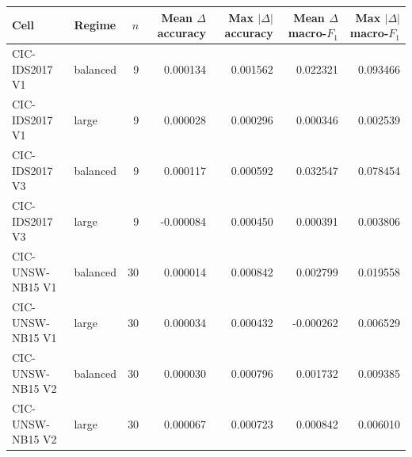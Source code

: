\begin{tabular}{@{}llrrrrr@{}}
\toprule
Cell & Regime & $n$ & Mean $\Delta$ accuracy & Max $|\Delta|$ accuracy & Mean $\Delta$ macro-$F_1$ & Max $|\Delta|$ macro-$F_1$ \\
\midrule
CIC-IDS2017 V1 & balanced & 9 & 0.000134 & 0.001562 & 0.022321 & 0.093466 \\
CIC-IDS2017 V1 & large & 9 & 0.000028 & 0.000296 & 0.000346 & 0.002539 \\
CIC-IDS2017 V3 & balanced & 9 & 0.000117 & 0.000592 & 0.032547 & 0.078454 \\
CIC-IDS2017 V3 & large & 9 & -0.000084 & 0.000450 & 0.000391 & 0.003806 \\
CIC-UNSW-NB15 V1 & balanced & 30 & 0.000014 & 0.000842 & 0.002799 & 0.019558 \\
CIC-UNSW-NB15 V1 & large & 30 & 0.000034 & 0.000432 & -0.000262 & 0.006529 \\
CIC-UNSW-NB15 V2 & balanced & 30 & 0.000030 & 0.000796 & 0.001732 & 0.009385 \\
CIC-UNSW-NB15 V2 & large & 30 & 0.000067 & 0.000723 & 0.000842 & 0.006010 \\
\bottomrule
\end{tabular}
